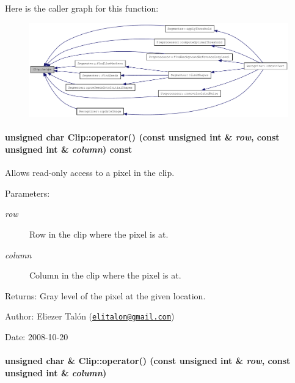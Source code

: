 Here is the caller graph for this function:\nopagebreak
\begin{figure}[H]
\begin{center}
\leavevmode
\includegraphics[width=420pt]{class_clip_939908a8dde602d25335792cc0fd5d97_icgraph}
\end{center}
\end{figure}
\hypertarget{class_clip_16b24276181affc5086cb4fe83269fb8}{
\paragraph[{operator()}]{\setlength{\rightskip}{0pt plus 5cm}unsigned char Clip::operator() (const unsigned int \& {\em row}, \/  const unsigned int \& {\em column}) const}\hfill}
\label{class_clip_16b24276181affc5086cb4fe83269fb8}


Allows read-only access to a pixel in the clip. 

\begin{Desc}
\item[Parameters:]
\begin{description}
\item[{\em row}]Row in the clip where the pixel is at. \item[{\em column}]Column in the clip where the pixel is at.\end{description}
\end{Desc}
\begin{Desc}
\item[Returns:]Gray level of the pixel at the given location.\end{Desc}
\begin{Desc}
\item[Author:]Eliezer Talón (\href{mailto:elitalon@gmail.com}{\tt elitalon@gmail.com}) \end{Desc}
\begin{Desc}
\item[Date:]2008-10-20 \end{Desc}
\hypertarget{class_clip_0f80c2b0f0f177fe9c780c93596f77be}{
\paragraph[{operator()}]{\setlength{\rightskip}{0pt plus 5cm}unsigned char \& Clip::operator() (const unsigned int \& {\em row}, \/  const unsigned int \& {\em column})}\hfill}
\label{class_clip_0f80c2b0f0f177fe9c780c93596f77be}


